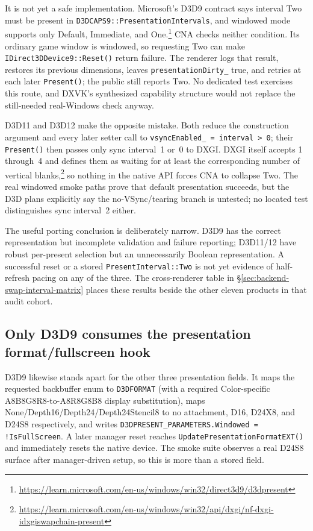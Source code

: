 It is not yet a safe implementation. Microsoft's D3D9 contract says interval Two must be
present in \texttt{D3DCAPS9::PresentationIntervals}, and windowed mode supports only Default,
Immediate, and One.\footnote{\url{https://learn.microsoft.com/en-us/windows/win32/direct3d9/d3dpresent}}
CNA checks neither condition. Its ordinary game window is windowed, so requesting Two can
make \texttt{IDirect3DDevice9::Reset()} return failure. The renderer logs that result, restores
its previous dimensions, leaves \texttt{presentationDirty\_} true, and retries at each later
\texttt{Present()}; the public  still reports Two. No
dedicated test exercises this route, and DXVK's synthesized capability structure would not
replace the still-needed real-Windows check anyway.

D3D11 and D3D12 make the opposite mistake. Both reduce the construction argument and every
later setter call to \texttt{vsyncEnabled\_ = interval > 0}; their
\texttt{Present()} then passes only sync interval~1 or~0 to DXGI. DXGI itself accepts
1 through~4 and defines them as waiting for at least the corresponding number of vertical
blanks,\footnote{\url{https://learn.microsoft.com/en-us/windows/win32/api/dxgi/nf-dxgi-idxgiswapchain-present}}
so nothing in the native API forces CNA to collapse Two. The real windowed smoke paths prove
that default presentation succeeds, but the D3D plans explicitly say the no-VSync/tearing
branch is untested; no located test distinguishes sync interval~2 either.

The useful porting conclusion is deliberately narrow. D3D9 has the correct representation
but incomplete validation and failure reporting; D3D11/12 have robust per-present selection
but an unnecessarily Boolean representation. A successful reset or a stored
\texttt{PresentInterval::Two} is not yet evidence of half-refresh pacing on any of the three.
The cross-renderer table in \S\ref{sec:backend-swap-interval-matrix} places these results beside
the other eleven products in that audit cohort.

\subsection{Only D3D9 consumes the presentation format/fullscreen hook}

D3D9 likewise stands apart for the other three presentation fields. It maps the requested
backbuffer enum to \texttt{D3DFORMAT} (with a required Color-specific A8B8G8R8-to-A8R8G8B8
display substitution), maps None/Depth16/Depth24/Depth24Stencil8 to no attachment,
D16, D24X8, and D24S8 respectively, and writes
\texttt{D3DPRESENT\_PARAMETERS.Windowed = !IsFullScreen}. A later manager reset reaches
\texttt{UpdatePresentationFormatEXT()} and immediately resets the native device. The smoke
suite observes a real D24S8 surface after manager-driven setup, so this is more than a stored
field.

